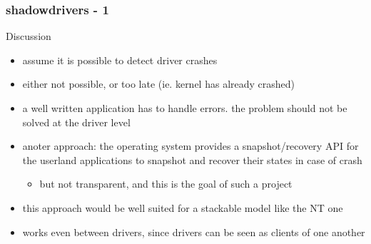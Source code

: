 \begin{frame}
  \frametitle{shadowdrivers - 1}
  Discussion
  \begin{itemize}
    \item assume it is possible to detect driver crashes
    \item either not possible, or too late (ie. kernel has already crashed)
    \item a well written application has to handle errors. the problem should not be solved at the driver level
    \item anoter approach: the operating system provides a snapshot/recovery API for the userland applications to snapshot and recover their states in case of crash
      \begin{itemize} \item but not transparent, and this is the goal of such a project \end{itemize}
    \item this approach would be well suited for a stackable model like the NT one
    \item works even between drivers, since drivers can be seen as clients of one another
  \end{itemize}
\end{frame}


